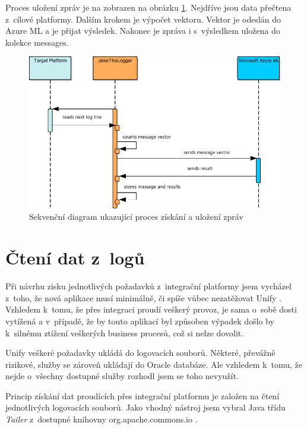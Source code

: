 \documentclass[thesis=M,czech]{FITthesis}[2012/10/20]
\newcommand{\tmpframe}[1]{\fbox{#1}}
\renewcommand{\tmpframe}[1]{#1}
\begin{document}
			Proces uložení zpráv je na zobrazen na obrázku \ref{fig:dataStoring-seq}. Nejdříve jsou data přečtena z~cílové platformy. Dalším krokem je výpočet vektoru. Vektor je odeslán do Azure ML a je přijat výsledek. Nakonec je zpráva i s~výsledkem uložena do kolekce messages.

			\begin{figure}[htb]\centering
				\tmpframe{\includegraphics[width=\textwidth]{./img/messagesStoring}}	
				\caption{Sekvenční diagram ukazující proces získání a uložení zpráv}
				\label{fig:dataStoring-seq}
			\end{figure}
	
				
	\section{Čtení dat z~logů}				
		Při návrhu zisku jednotlivých požadavků z~integrační platformy jsem vycházel z~toho, že nová aplikace musí minimálně, či spíše vůbec nezatěžovat Unify \cite{unify}. Vzhledem k~tomu, že přes integraci proudí veškerý provoz, je sama o~sobě dosti vytížená a v~případě, že by touto aplikací byl způsoben výpadek došlo by k~silnému ztížení veškerých business procesů, což si nelze dovolit.
		
		Unify veškeré požadavky ukládá do logovacích souborů. Některé, převážně rizikové, služby se zároveň ukládají do Oracle databáze. Ale vzhledem k~tomu, že nejde o~všechny dostupné služby rozhodl jsem se toho nevyužít.
		
		Princip získání dat proudících přes integrační platformu je založen na čtení jednotlivých logovacích souborů. Jako vhodný nástroj jsem vybral Java třídu \textit{Tailer} z~dostupné knihovny org.apache.commons.io \cite{tailerClass}.
		
\end{document}
